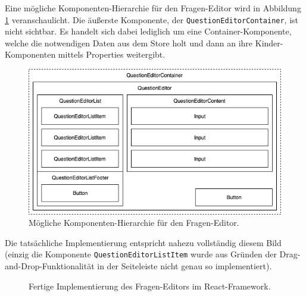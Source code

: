 Eine mögliche Komponenten-Hierarchie für den Fragen-Editor wird in Abbildung \ref{abb:komponenten_hierarchie} veranschaulicht. Die äußerste Komponente, der \texttt{QuestionEditorContainer}, ist nicht sichtbar. Es handelt sich dabei lediglich um eine Container-Komponente, welche die notwendigen Daten aus dem Store holt und dann an ihre Kinder-Komponenten mittels Properties weitergibt.

\begin{figure}[H]
    \includegraphics[width=\textwidth]{chapter/entwurf/bilder/Component_Hierarchy.png}
    \centering
    \caption[Komponenten-Hierarchie des Fragen-Editors]{Mögliche Komponenten-Hierarchie für den Fragen-Editor.}
    \label{abb:komponenten_hierarchie}
\end{figure}

Die tatsächliche Implementierung entspricht nahezu vollständig diesem Bild (einzig die Komponente \texttt{QuestionEditorListItem} wurde aus Gründen der Drag-and-Drop-Funktionalität in der Seiteleiste nicht genau so implementiert).


\begin{figure}[H]
    \centering
    \setlength{\fboxsep}{0pt}
    \setlength{\fboxrule}{0.5pt}
    \caption[Fertiger Fragen-Editor in Weclare]{Fertige Implementierung des Fragen-Editors im React-Framework.}
    \label{abb:weclare_editor}
\end{figure}

